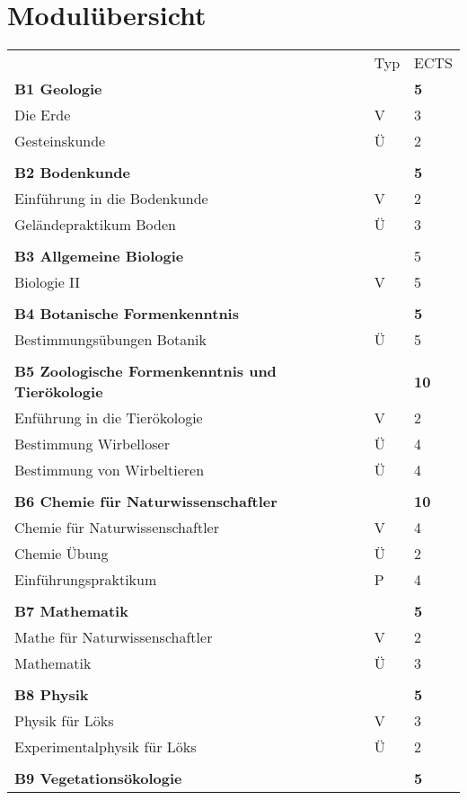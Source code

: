 \section{Modulübersicht}
\begin{longtable}{p{} p{} p{}}
 & Typ & ECTS \\ 
\textbf{B1 Geologie} & & \textbf{5}\\ 
Die Erde & V & 3\\
Gesteinskunde & Ü & 2\\
& &\\
\textbf{B2 Bodenkunde}& & \textbf{5}\\
Einführung in die Bodenkunde & V & 2\\
Geländepraktikum Boden & Ü & 3\\
& &\\
\textbf{B3 Allgemeine Biologie}& & 5\\
Biologie II & V &5\\
& &\\
\textbf{B4 Botanische Formenkenntnis} & & \textbf{5}\\
Bestimmungsübungen Botanik & Ü & 5\\
& &\\
\textbf{B5 Zoologische Formenkenntnis und Tierökologie} & &\textbf{10}\\
Enführung in die Tierökologie & V & 2\\
Bestimmung Wirbelloser & Ü & 4\\
Bestimmung von Wirbeltieren & Ü & 4\\
& &\\
\textbf{B6 Chemie für Naturwissenschaftler} & & \textbf{10}\\
Chemie für Naturwissenschaftler & V & 4\\
Chemie Übung & Ü & 2\\
Einführungspraktikum & P & 4 \\
&&\\
\textbf{B7 Mathematik} & &\textbf{5}\\
Mathe für Naturwissenschaftler & V & 2\\
Mathematik & Ü & 3\\
&&\\
\textbf{B8 Physik} & & \textbf{5}\\
Physik für Löks & V & 3 \\
Experimentalphysik für Löks & Ü & 2\\
&&\\
\textbf{B9 Vegetationsökologie} & & \textbf{5}\\

\end{longtable}

